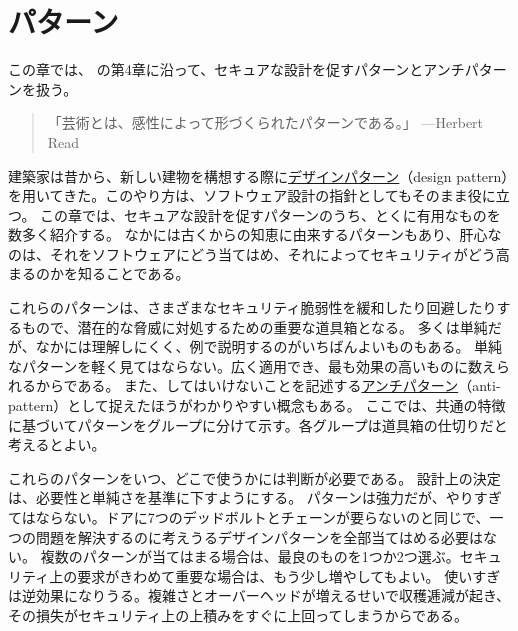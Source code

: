 \documentclass[uplatex]{jsarticle}
\begin{document}
\newpage

\section{パターン}

この章では、\cite{Kohnfelder2021} の第4章に沿って、セキュアな設計を促すパターンとアンチパターンを扱う。

\begin{quote}
「芸術とは、感性によって形づくられたパターンである。」 ---Herbert Read
\end{quote}

建築家は昔から、新しい建物を構想する際に\underline{デザインパターン}（design pattern）を用いてきた。このやり方は、ソフトウェア設計の指針としてもそのまま役に立つ。
この章では、セキュアな設計を促すパターンのうち、とくに有用なものを数多く紹介する。
なかには古くからの知恵に由来するパターンもあり、肝心なのは、それをソフトウェアにどう当てはめ、それによってセキュリティがどう高まるのかを知ることである。

これらのパターンは、さまざまなセキュリティ脆弱性を緩和したり回避したりするもので、潜在的な脅威に対処するための重要な道具箱となる。
多くは単純だが、なかには理解しにくく、例で説明するのがいちばんよいものもある。
単純なパターンを軽く見てはならない。広く適用でき、最も効果の高いものに数えられるからである。
また、してはいけないことを記述する\underline{アンチパターン}（anti-pattern）として捉えたほうがわかりやすい概念もある。
ここでは、共通の特徴に基づいてパターンをグループに分けて示す。各グループは道具箱の仕切りだと考えるとよい。


これらのパターンをいつ、どこで使うかには判断が必要である。
設計上の決定は、必要性と単純さを基準に下すようにする。
パターンは強力だが、やりすぎてはならない。ドアに7つのデッドボルトとチェーンが要らないのと同じで、一つの問題を解決するのに考えうるデザインパターンを全部当てはめる必要はない。
複数のパターンが当てはまる場合は、最良のものを1つか2つ選ぶ。セキュリティ上の要求がきわめて重要な場合は、もう少し増やしてもよい。
使いすぎは逆効果になりうる。複雑さとオーバーヘッドが増えるせいで収穫逓減が起き、その損失がセキュリティ上の上積みをすぐに上回ってしまうからである。
\end{document}
